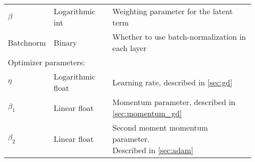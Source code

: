 \begin{table}
\begin{tabular}{lll}
$\beta$ & Logarithmic int & Weighting parameter for the latent term \\
Batchnorm & Binary & Whether to use batch-normalization in each layer \\
\midrule
\multicolumn{3}{l}{Optimizer parameters: } \\
\midrule
$\eta$ & Logarithmic float & Learning rate, described in \ref{sec:gd} \\
$\beta_1$ & Linear float & Momentum parameter, described in \ref{sec:momentum_gd} \\
$\beta_2$ & Linear float & \makecell[l]{Second moment momentum parameter. \\ Described in \ref{sec:adam}}\\
\bottomrule
\end{tabular}
\end{table}

